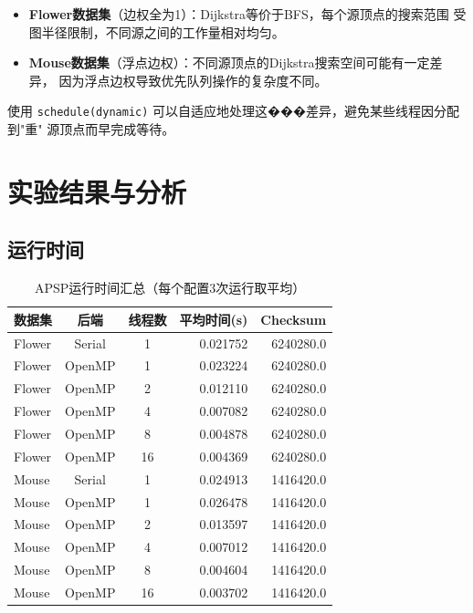 \documentclass[UTF8,a4paper,12pt,fontset=none]{ctexart}
\begin{document}
\begin{itemize}
  \item \textbf{Flower数据集}（边权全为1）：Dijkstra等价于BFS，每个源顶点的搜索范围
        受图半径限制，不同源之间的工作量相对均匀。
  \item \textbf{Mouse数据集}（浮点边权）：不同源顶点的Dijkstra搜索空间可能有一定差异，
        因为浮点边权导致优先队列操作的复杂度不同。
\end{itemize}

使用 \texttt{schedule(dynamic)} 可以自适应地处理这���差异，避免某些线程因分配到"重"
源顶点而早完成等待。

\section{实验结果与分析}

\subsection{运行时间}

\begin{table}[H]
  \centering
  \caption{APSP运行时间汇总（每个配置3次运行取平均）}
  \label{tab:runtime}
  \begin{tabular}{lccrr}
    \toprule
    数据集 & 后端 & 线程数 & 平均时间(s) & Checksum \\
    \midrule
    Flower & Serial & 1 & 0.021752 & 6240280.0 \\
    Flower & OpenMP & 1 & 0.023224 & 6240280.0 \\
    Flower & OpenMP & 2 & 0.012110 & 6240280.0 \\
    Flower & OpenMP & 4 & 0.007082 & 6240280.0 \\
    Flower & OpenMP & 8 & 0.004878 & 6240280.0 \\
    Flower & OpenMP & 16 & 0.004369 & 6240280.0 \\
    \midrule
    Mouse & Serial & 1 & 0.024913 & 1416420.0 \\
    Mouse & OpenMP & 1 & 0.026478 & 1416420.0 \\
    Mouse & OpenMP & 2 & 0.013597 & 1416420.0 \\
    Mouse & OpenMP & 4 & 0.007012 & 1416420.0 \\
    Mouse & OpenMP & 8 & 0.004604 & 1416420.0 \\
    Mouse & OpenMP & 16 & 0.003702 & 1416420.0 \\
    \bottomrule
  \end{tabular}
\end{table}
\end{document}
